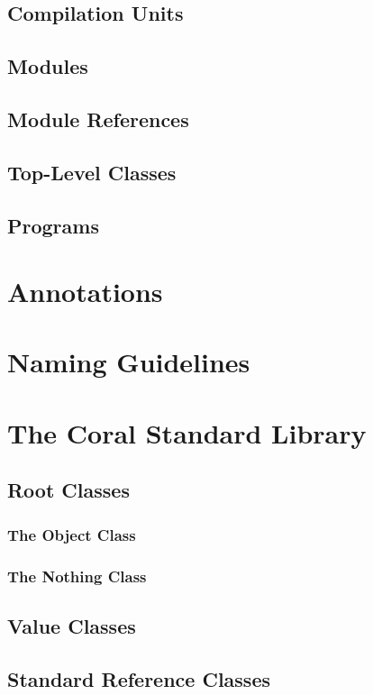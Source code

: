 \section{Compilation Units}

\section{Modules}
\label{sec:modules}

\section{Module References}

\section{Top-Level Classes}

\section{Programs}

\chapter{Annotations}
\label{sec:annotations}

\chapter{Naming Guidelines}

\chapter{The Coral Standard Library}

\section{Root Classes}

\subsection{The Object Class}

\subsection{The Nothing Class}

\section{Value Classes}

\section{Standard Reference Classes}



















